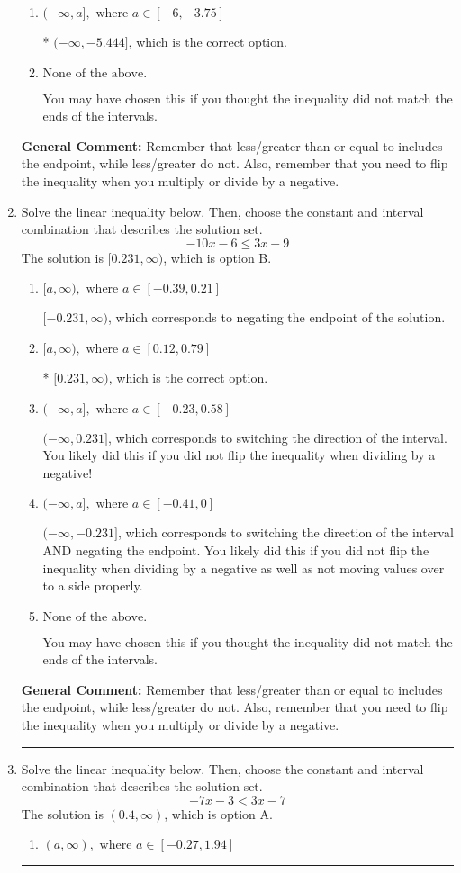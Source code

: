 \documentclass{extbook}[14pt]
\newcommand{\litem}[1]{\item #1

\rule{\textwidth}{0.4pt}}
\begin{document}
\begin{enumerate}
{\begin{enumerate}[label=\Alph*.]
 $(-\infty, 5.444]$, which corresponds to negating the endpoint of the solution.
\item \( (-\infty, a], \text{ where } a \in [-6, -3.75] \)

* $(-\infty, -5.444]$, which is the correct option.
\item \( \text{None of the above}. \)

You may have chosen this if you thought the inequality did not match the ends of the intervals.
\end{enumerate}

\textbf{General Comment:} Remember that less/greater than or equal to includes the endpoint, while less/greater do not. Also, remember that you need to flip the inequality when you multiply or divide by a negative.
}
\litem{
Solve the linear inequality below. Then, choose the constant and interval combination that describes the solution set.
\[ -10x -6 \leq 3x -9 \]The solution is \( [0.231, \infty) \), which is option B.\begin{enumerate}[label=\Alph*.]
\item \( [a, \infty), \text{ where } a \in [-0.39, 0.21] \)

 $[-0.231, \infty)$, which corresponds to negating the endpoint of the solution.
\item \( [a, \infty), \text{ where } a \in [0.12, 0.79] \)

* $[0.231, \infty)$, which is the correct option.
\item \( (-\infty, a], \text{ where } a \in [-0.23, 0.58] \)

 $(-\infty, 0.231]$, which corresponds to switching the direction of the interval. You likely did this if you did not flip the inequality when dividing by a negative!
\item \( (-\infty, a], \text{ where } a \in [-0.41, 0] \)

 $(-\infty, -0.231]$, which corresponds to switching the direction of the interval AND negating the endpoint. You likely did this if you did not flip the inequality when dividing by a negative as well as not moving values over to a side properly.
\item \( \text{None of the above}. \)

You may have chosen this if you thought the inequality did not match the ends of the intervals.
\end{enumerate}

\textbf{General Comment:} Remember that less/greater than or equal to includes the endpoint, while less/greater do not. Also, remember that you need to flip the inequality when you multiply or divide by a negative.
}
\litem{
Solve the linear inequality below. Then, choose the constant and interval combination that describes the solution set.
\[ -7x -3 < 3x -7 \]The solution is \( (0.4, \infty) \), which is option A.\begin{enumerate}[label=\Alph*.]
\item \( (a, \infty), \text{ where } a \in [-0.27, 1.94] \)


\end{enumerate}}
\end{enumerate}
\end{document}
